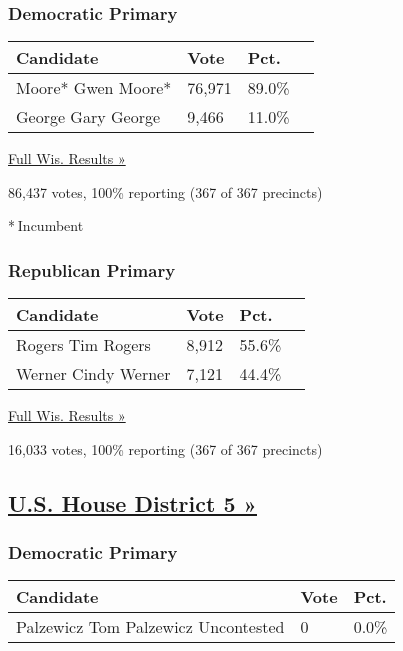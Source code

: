 \hypertarget{democratic-primary-5}{%
\subsubsection{Democratic Primary}\label{democratic-primary-5}}

\begin{longtable}[]{@{}llll@{}}
\toprule
Candidate & Vote & Pct. &\tabularnewline
\midrule
\endhead
 Moore* Gwen Moore* & 76,971 & 89.0\% &\tabularnewline
 George Gary George & 9,466 & 11.0\% &\tabularnewline
\bottomrule
\end{longtable}

\href{https://www.nytimes3xbfgragh.onion/elections/results/wisconsin}{Full
Wis. Results »}

86,437 votes, 100\% reporting (367 of 367 precincts)

* Incumbent

\hypertarget{republican-primary-4}{%
\subsubsection{Republican Primary}\label{republican-primary-4}}

\begin{longtable}[]{@{}llll@{}}
\toprule
Candidate & Vote & Pct. &\tabularnewline
\midrule
\endhead
 Rogers Tim Rogers & 8,912 & 55.6\% &\tabularnewline
 Werner Cindy Werner & 7,121 & 44.4\% &\tabularnewline
\bottomrule
\end{longtable}

\href{https://www.nytimes3xbfgragh.onion/elections/results/wisconsin}{Full
Wis. Results »}

16,033 votes, 100\% reporting (367 of 367 precincts)

\hypertarget{us-house-district-5-}{%
\subsection{\texorpdfstring{\href{https://www.nytimes3xbfgragh.onion/elections/results/wisconsin-house-district-5-primary-election}{U.S.
House District 5
»}}{U.S. House District 5 »}}\label{us-house-district-5-}}

\hypertarget{democratic-primary-6}{%
\subsubsection{Democratic Primary}\label{democratic-primary-6}}

\begin{longtable}[]{@{}lll@{}}
\toprule
Candidate & Vote & Pct.\tabularnewline
\midrule
\endhead
 Palzewicz Tom Palzewicz Uncontested & 0 & 0.0\%\tabularnewline
\bottomrule
\end{longtable}

